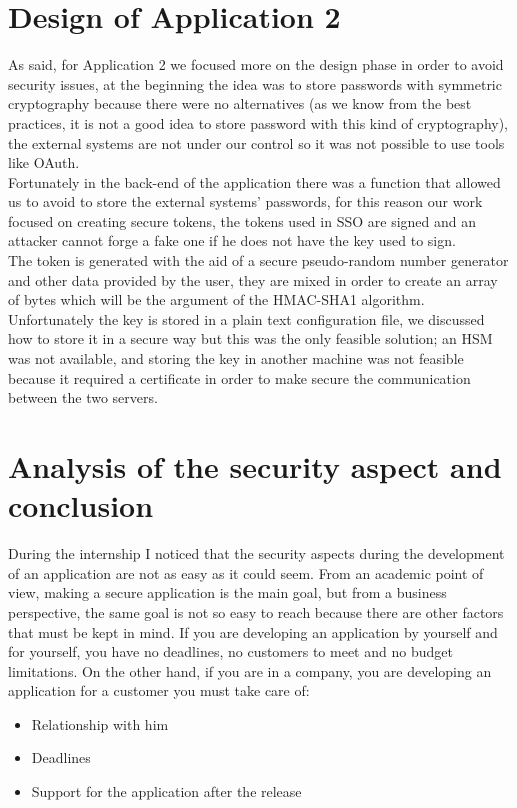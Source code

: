 \section{Design of Application 2}
As said, for Application 2 we focused more on the design phase in order to avoid security issues, at the beginning the idea was to
store passwords with symmetric cryptography because there were no alternatives (as we know from the best practices, it is not a good idea to store password with this kind of cryptography), the external systems are not under our control so
it was not possible to use tools like OAuth.\\
Fortunately in the back-end of the application there was a function that allowed us to avoid to store the external systems' passwords,
for this reason our work focused on creating secure tokens, the tokens used in SSO are signed and an attacker cannot forge a fake one
if he does not have the key used to sign.\\
The token is generated with the aid of a secure pseudo-random number generator and other data provided by the user, they are mixed in order to
create an array of bytes which will be the argument of the HMAC-SHA1 algorithm.\\
Unfortunately the key is stored in a plain text configuration file, we discussed how to store it in a secure way but this was the only feasible
solution; an HSM was not available, and storing the key in another machine was not feasible because it required a certificate in order to
make secure the communication between the two servers.\\


\section{Analysis of the security aspect and conclusion}
During the internship I noticed that the security aspects during the development of an application are not as easy as it could seem.\newline
From an academic point of view, making a secure application is the main goal, but from a business perspective, the same goal is not so easy to reach because there are other factors that must be kept in mind.\newline
If you are developing an application by yourself and for yourself, you have no deadlines, no customers to meet and no budget limitations.\newline
On the other hand, if you are in a company, you are developing an application for a customer you must take care of:
\begin{itemize}
	\item Relationship with him
	\item Deadlines
	\item Support for the application after the release
\end{itemize}

